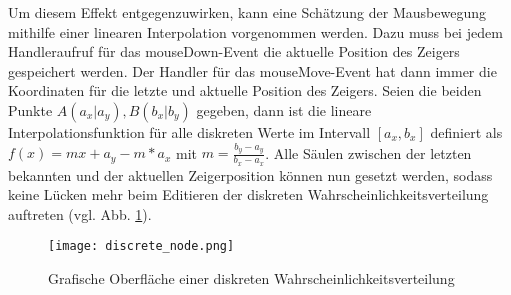 Um diesem Effekt entgegenzuwirken, kann eine Schätzung der Mausbewegung mithilfe einer linearen Interpolation vorgenommen werden. Dazu muss bei jedem Handleraufruf für das mouseDown-Event die aktuelle Position des Zeigers gespeichert werden. Der Handler für das mouseMove-Event hat dann immer die Koordinaten für die letzte und aktuelle Position des Zeigers. Seien die beiden Punkte $A(a_x|a_y), B(b_x|b_y)$ gegeben, dann ist die lineare Interpolationsfunktion für alle diskreten Werte im Intervall $[a_x,b_x]$ definiert als $f(x)=mx+a_y-m*a_x$ mit $m=\frac{b_y-a_y}{b_x-a_x}$. Alle Säulen zwischen der letzten bekannten und der aktuellen Zeigerposition können nun gesetzt werden, sodass keine Lücken mehr beim Editieren der diskreten Wahrscheinlichkeitsverteilung auftreten (vgl. Abb. \ref{fig:discretenode}).

\begin{figure}[H]
    \centering
    \texttt{[image: discrete\_node.png]}
    \caption{Grafische Oberfläche einer diskreten Wahrscheinlichkeitsverteilung}
    \label{fig:discretenode}
\end{figure}
